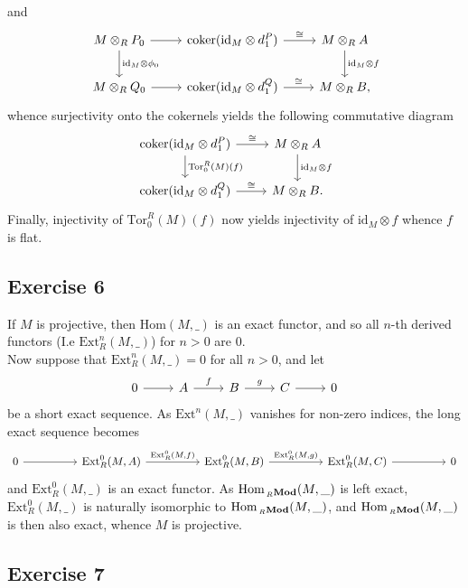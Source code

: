 \documentclass{article}
\theoremstyle{definition}
\newcommand{\Hom}{\text{Hom}}
\newcommand{\coker}{\text{coker}}
\newcommand{\id}{\text{id}}
\newcommand{\Tor}{\text{Tor}}
\newcommand{\Ext}{\text{Ext}}
\newcommand{\catname}[1]{{\normalfont\textbf{#1}}}
\newcommand{\RMod}{\,_{R}\catname{Mod}}
\begin{document}
and
\[
\begin{tikzcd}
	M \otimes_{R} P_0
	\ar{r}
	\ar{d}{\id_M \otimes \phi_0}
	& \coker(\id_{M} \otimes d^{P}_{1})
	\ar{r}{\cong}
	& M \otimes_R A
	\ar{d}{\id_M \otimes f}
	\\
	M \otimes_{R} Q_0
	\ar{r}
	& \coker(\id_{M} \otimes d^{Q}_{1})
	\ar{r}{\cong} 
	& M \otimes_R B,
\end{tikzcd}
\]
whence surjectivity onto the cokernels yields the following commutative diagram
\[
\begin{tikzcd}
	\coker(\id_{M} \otimes d^{P}_{1})
	\ar{d}{\Tor^{R}_{0}(M)(f)}
	\ar{r}{\cong}
	& M \otimes_R A
	\ar{d}{\id_M \otimes f}
	\\
	\coker(\id_{M} \otimes d^{Q}_{1})
	\ar{r}{\cong}
	& M \otimes_R B.
\end{tikzcd}
\]
Finally, injectivity of $\Tor^{R}_0(M)(f)$ now yields injectivity of $\id_M
\otimes f$ whence $f$ is flat.


\subsection*{Exercise 6}

If $M$ is projective, then $\Hom(M, \_)$ is an exact functor, and so all $n$-th
derived functors (I.e $\Ext^{n}_{R}(M, \_)$) for $n > 0$ are $0$. \\

Now suppose that $\Ext^{n}_{R}(M, \_) = 0$ for all $n > 0$, and let 
\[
\begin{tikzcd}
0
\ar{r}
& A
\ar{r}{f}
& B
\ar{r}{g}
& C
\ar{r}
& 0
\end{tikzcd}
\] 
be a short exact sequence. As $\Ext^{n}(M, \_)$ vanishes for non-zero 
indices, the long exact sequence becomes 
\[
\begin{tikzcd}[column sep = huge]
0
\ar{r}
& \Ext^{0}_{R}(M, A)
\ar{r}{\Ext^{0}_R(M, f)}
& \Ext^{0}_{R}(M, B)
\ar{r}{\Ext^{0}_R(M, g)}
& \Ext^{0}_{R}(M, C)
\ar{r}
& 0
\end{tikzcd}
\] 
and $\Ext^{0}_{R}(M, \_)$ is an exact functor. As $\Hom_{\RMod}(M, \_)$ is
left exact, $\Ext^{0}_{R}(M, \_)$ is naturally isomorphic to $\Hom_{\RMod}(M,
\_)$, and $\Hom_{\RMod}(M, \_)$ is then also exact, whence $M$ is projective.


\subsection*{Exercise 7}
\end{document}
